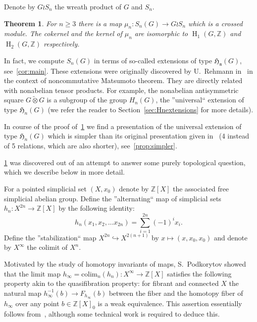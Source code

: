 \documentclass[oneside, 10pt]{amsart}
\theoremstyle{plain}
\newtheorem{thm}{Theorem}
\numberwithin{equation}{section}
\numberwithin{lemma}{section}
\theoremstyle{remark}
\theoremstyle{definition}
\DeclareMathOperator{\HH}{H}
\newcommand{\ZZ}{\mathbb{Z}}
\begin{document}
Denote by $G\wr S_n$ the wreath product of $G$ and $S_n$.
\begin{thm} \label{thm:summary} For $n \geq 3$ there is a map $\mu_n\colon S_n(G) \to G \wr S_n$ which is a crossed module.
The cokernel and the kernel of $\mu_n$ are isomorphic to $\HH_1(G, \ZZ)$ and $\HH_2(G, \ZZ)$ respectively.
\end{thm}
In fact, we compute $S_n(G)$ in terms of so-called extensions of type $\mathfrak{H_n}(G)$, see~\cref{cor:main}.
These extensions were originally discovered by U.~Rehmann in~\cite{Reh78} in the context of noncommutative Matsumoto theorem.
They are directly related with nonabelian tensor products.
For example, the nonabelian antisymmetric square $G \mathbin{\widetilde{\otimes}} G$ is a subgroup of the group $H_n(G)$, the ''universal`` extension of type $\mathfrak{H}_n(G)$
 (we refer the reader to Section~\ref{sec:Hnextensions} for more details).

 
In course of the proof of~\cref{thm:summary} we find a presentation of the universal extension of type $\mathfrak{H}_n(G)$ which is
 simpler than its original presentation given in~\cite{Reh78} (4 instead of 5 relations, which are also shorter), see~\cref{prop:simpler}.

\cref{thm:summary} was discovered out of an attempt to answer some purely topological question, which we describe below in more detail.

For a pointed simplicial set $(X, x_0)$ denote by $\ZZ[X]$ the associated free simplicial abelian group.
Define the ''alternating`` map of simplicial sets $h_n\colon X^{2n} \to \ZZ[X]$ by the following identity:
 \[h_n(x_1, x_2, \ldots x_{2n}) = \sum\limits_{i=1}^{2n}(-1)^ix_i.\]
Define the ''stabilization`` map $X^{2n} \hookrightarrow X^{2(n+1)}$ by $x \mapsto (x, x_0, x_0)$ and denote by $X^\infty$ the colimit of $X^n$.

Motivated by the study of homotopy invariants of maps, S.~Podkorytov showed that the limit map 
$h_\infty = \mathrm{colim}_n(h_n) \colon X^\infty \to \ZZ[X]$ satisfies the following property akin to the quasifibration property:
for fibrant and connected $X$ the natural map $h^{-1}_\infty(b) \to F_{h_\infty}(b)$ between the fiber
 and the homotopy fiber of $h_\infty$ over any point $b \in \ZZ[X]_0$ is a weak equivalence.
This assertion essentially follows from~\cite[Lemma~9.1]{Po17}, although some technical work is required to deduce this. %
\end{document}
